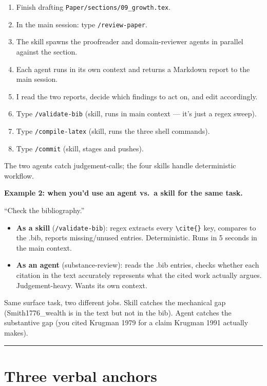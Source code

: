 \documentclass[10pt]{article}
\begin{document}
\begin{enumerate}[leftmargin=1.5em, itemsep=0.05em, label=\arabic*.]
  \item Finish drafting \texttt{Paper/sections/09\_growth.tex}.
  \item In the main session: type \texttt{/review-paper}.
  \item The skill spawns the proofreader and domain-reviewer agents in parallel against the section.
  \item Each agent runs in its own context and returns a Markdown report to the main session.
  \item I read the two reports, decide which findings to act on, and edit accordingly.
  \item Type \texttt{/validate-bib} (skill, runs in main context --- it's just a regex sweep).
  \item Type \texttt{/compile-latex} (skill, runs the three shell commands).
  \item Type \texttt{/commit} (skill, stages and pushes).
\end{enumerate}
The two agents catch judgement-calls; the four skills handle deterministic workflow.

\medskip

\textbf{Example 2: when you'd use an agent vs.\ a skill for the same task.}

``Check the bibliography.''

\begin{itemize}[leftmargin=1.4em, itemsep=0.05em]
  \item \textbf{As a skill} (\texttt{/validate-bib}): regex extracts every \texttt{\textbackslash cite\{\}} key, compares to the .bib, reports missing/unused entries. Deterministic. Runs in 5 seconds in the main context.
  \item \textbf{As an agent} (substance-review): reads the .bib entries, checks whether each citation in the text accurately represents what the cited work actually argues. Judgement-heavy. Wants its own context.
\end{itemize}
Same surface task, two different jobs. Skill catches the mechanical gap (Smith1776\_wealth is in the text but not in the bib). Agent catches the substantive gap (you cited Krugman 1979 for a claim Krugman 1991 actually makes).

\vspace{0.4em}
\hrule
\vspace{0.4em}

\section*{Three verbal anchors}
\end{document}
